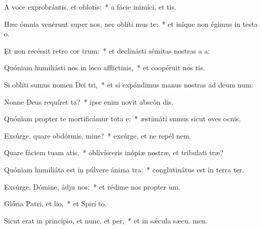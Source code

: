 \item A voce exprobrántis, et oblotis:~* a fácie inimíci, et tis.
\item Hæc ómnia venérunt super nos, nec oblíti mus te:~* et iníque non égimus in testa o.
\item Et non recéssit retro cor trum:~* et declinásti sémitas nostras a  a:
\item Quóniam humiliásti nos in loco afflictinis,~* et coopéruit nos  tis.
\item Si oblíti sumus nomen Dei tri,~* et si expándimus manus nostras ad deum num:
\item Nonne Deus requíret ta?~* ipse enim novit abscón dis.
\item Quóniam propter te mortificámur tota e:~* æstimáti sumus sicut oves ocnis.
\item Exsúrge, quare obdórmis, mine?~* exsúrge, et ne repél  nem.
\item Quare fáciem tuam atis,~* oblivísceris inópiæ nostræ, et tribulati træ?
\item Quóniam humiliáta est in púlvere ánima tra:~* conglutinátus est in terra  ter.
\item Exsúrge, Dómine, ádju nos:~* et rédime nos propter  um.
\item Glória Patri, et lio,~* et Spirí to.
\item Sicut erat in princípio, et nunc, et per,~* et in sǽcula sæcu. men.
